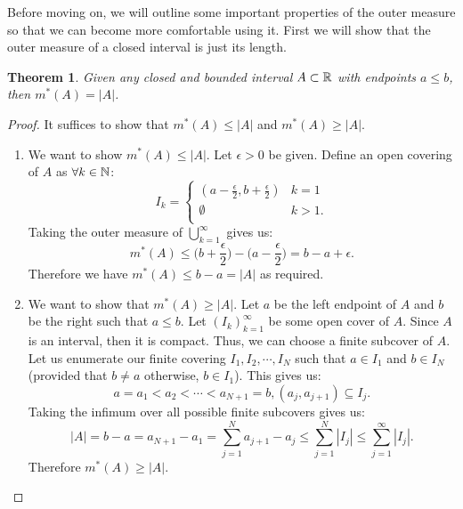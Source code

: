 \documentclass{article}
\newtheorem{theorem}{Theorem}
\theoremstyle{axiom} \newtheorem{axiom}{Axiom}
\theoremstyle{definition} \newtheorem{definition}{Definition}
\theoremstyle{example} \newtheorem{example}{Example}
\theoremstyle{proposition} \newtheorem{prop}{Proposition}
\theoremstyle{lemma} \newtheorem{lemma}{Lemma}
\begin{document}
Before moving on, we will outline some important properties of the outer
measure so that we can become more comfortable using it. First we will show 
that the outer measure of a closed interval is just its length.
\begin{theorem}
	Given any closed and bounded interval $A \subset \mathbb{R}$ with endpoints $a\leq b$, 
	then $m^*(A) = |A|$.
\end{theorem}
\begin{proof}
	It suffices to show that $m^*(A) \leq |A|$ and $m^*(A) \geq |A|$.
	\begin{enumerate}
	\item 
		We want to show $m^*(A) \leq |A|$. Let $\epsilon > 0$ be given. 
		Define an open covering of $A$ as $\forall k \in \mathbb{N}$:
		\begin{equation*}
			I_k = \begin{cases}
				(a-\frac{\epsilon}{2}, b+\frac{\epsilon}{2}) & k = 1\\
				\emptyset &  k > 1. \\
		\end{cases}
		\end{equation*}
		Taking the outer measure of $\bigcup_{k=1}^{\infty}$ gives us:
		\begin{equation*}
			m^*(A) \leq \big(b+\frac{\epsilon}{2}\big) - \big(a-\frac{\epsilon}{2}\big) = b-a+\epsilon. 
		\end{equation*}
		Therefore we have $m^*(A) \leq b-a = |A|$ as required.
	\item We want to show that $m^*(A) \geq |A|$. Let $a$ be the left endpoint of
		$A$ and $b$ be the right such that $a \leq b$. Let $(I_k)^{\infty}_{k=1}$ be
		some open cover of $A$.	Since $A$ is an interval, then it is compact. 
		Thus, we can choose a finite subcover of $A$. Let us enumerate our finite 
		covering $I_1,I_2,\cdots,I_N$ such that $a \in I_1$ and $b \in I_N$ 
		(provided that $b\neq a$ otherwise, $b\in I_1$). This gives us:
		\begin{equation*}
			a = a_1 < a_2 < \cdots < a_{N+1} = b, (a_j,a_{j+1}) \subseteq I_{j}.
		\end{equation*}
		Taking the infimum over all possible finite subcovers gives us:
		\begin{equation*}
			|A| = b - a = a_{N+1} - a_1 = \sum^{N}_{j=1} a_{j+1} - a_{j} \leq 
			\sum_{j=1}^{N} |I_j| \leq \sum_{j=1}^{\infty} |I_j|.
		\end{equation*}
		Therefore $m^*(A) \geq |A|$.
	\end{enumerate}
\end{proof}
\end{document}
